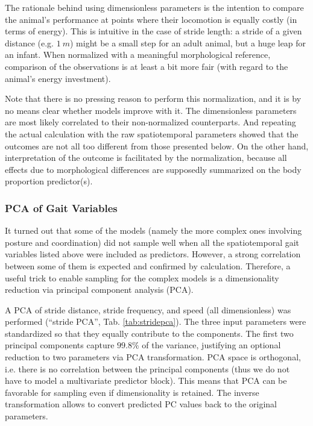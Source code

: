 The rationale behind using dimensionless parameters is the intention to compare the animal's performance at points where their locomotion is equally costly (in terms of energy).
This is intuitive in the case of stride length: a stride of a given distance (e.g. \(1\ m\)) might be a small step for an adult animal, but a huge leap for an infant.
When normalized with a meaningful morphological reference, comparison of the observations is at least a bit more fair (with regard to the animal's energy investment).

Note that there is no pressing reason to perform this normalization, and it is by no means clear whether models improve with it.
The dimensionless parameters are most likely correlated to their non-normalized counterparts.
And repeating the actual calculation with the raw spatiotemporal parameters showed that the outcomes are not all too different from those presented below.
On the other hand, interpretation of the outcome is facilitated by the normalization, because all effects due to morphological differences are supposedly summarized on the body proportion predictor(s).


\subsubsection{PCA of Gait Variables}
\label{prep:stridepca}
It turned out that some of the models (namely the more complex ones involving posture and coordination) did not sample well when all the spatiotemporal gait variables listed above were included as predictors.
However, a strong correlation between some of them is expected and confirmed by calculation.
Therefore, a useful trick to enable sampling for the complex models is a dimensionality reduction via principal component analysis (PCA).

A PCA of stride distance, stride frequency, and speed (all dimensionless) was performed (``stride PCA'', Tab. \ref{tab:stridepca}).
The three input parameters were standardized so that they equally contribute to the components.
The first two principal components capture \(99.8 \%\) of the variance, justifying an optional reduction to two parameters via PCA transformation.
PCA space is orthogonal, i.e. there is no correlation between the principal components (thus we do not have to model a multivariate predictor block).
This means that PCA can be favorable for sampling even if dimensionality is retained.
The inverse transformation allows to convert predicted PC values back to the original parameters.
\bigskip

